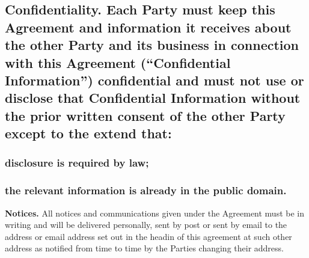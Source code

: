 \documentclass[a4paper]{article}
\begin{document}
\subsection{\textbf{Confidentiality}.  Each Party must keep this Agreement and information it receives about the other Party and its business in connection with this Agreement (``\textbf{Confidential Information}'') confidential and must not use or disclose that Confidential Information without the prior written consent of the other Party except to the extend that:}

\subsubsection{disclosure is required by law;}

\subsubsection{the relevant information is already in the public domain.}

\textbf{Notices.}  All notices and communications given under the Agreement must be in writing and will be delivered personally, sent by post or sent by email to the address or email address set out in the headin of this agreement at such other address as notified from time to time by the Parties changing their address.
\end{document}
